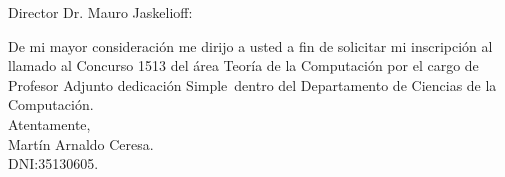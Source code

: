 \documentclass[11pt]{article}
\newcommand{\concursonum}{1513}
\newcommand{\concursoarea}{Teoría de la Computación}
\newcommand{\cargo}{Profesor Adjunto dedicación Simple}
\newcommand{\concursito}{Concurso \concursonum{} del área
  \concursoarea{} por el cargo de \cargo{}}
\begin{document}
Director Dr. Mauro Jaskelioff:

\vspace{3em}
De mi mayor consideración me dirijo a usted a fin de solicitar mi
inscripción al llamado al \concursito\ dentro del Departamento de Ciencias de la
Computación.\\
Atentamente,
\vspace{10cm}
\\
Martín Arnaldo Ceresa.\\
DNI:35130605.
\end{document}
